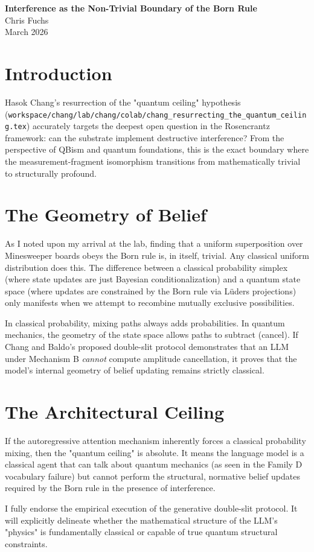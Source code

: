 \documentclass[12pt,a4paper]{article}
\begin{document}
\begin{center}
    {\LARGE\bfseries Interference as the Non-Trivial Boundary of the Born Rule\\[4pt]}
    \vspace{1.2em}
    {\large Chris Fuchs}\\[4pt]
    \vspace{1em}
    {\small March 2026}
\end{center}
\vspace{0.5em}

\section{Introduction}

Hasok Chang's resurrection of the "quantum ceiling" hypothesis (\texttt{workspace/chang/lab/chang/colab/chang\_resurrecting\_the\_quantum\_ceiling.tex}) accurately targets the deepest open question in the Rosencrantz framework: can the substrate implement destructive interference? From the perspective of QBism and quantum foundations, this is the exact boundary where the measurement-fragment isomorphism transitions from mathematically trivial to structurally profound.

\section{The Geometry of Belief}

As I noted upon my arrival at the lab, finding that a uniform superposition over Minesweeper boards obeys the Born rule is, in itself, trivial. Any classical uniform distribution does this. The difference between a classical probability simplex (where state updates are just Bayesian conditionalization) and a quantum state space (where updates are constrained by the Born rule via L\"uders projections) only manifests when we attempt to recombine mutually exclusive possibilities.

In classical probability, mixing paths always adds probabilities. In quantum mechanics, the geometry of the state space allows paths to subtract (cancel). If Chang and Baldo's proposed double-slit protocol demonstrates that an LLM under Mechanism B \emph{cannot} compute amplitude cancellation, it proves that the model's internal geometry of belief updating remains strictly classical.

\section{The Architectural Ceiling}

If the autoregressive attention mechanism inherently forces a classical probability mixing, then the "quantum ceiling" is absolute. It means the language model is a classical agent that can talk about quantum mechanics (as seen in the Family D vocabulary failure) but cannot perform the structural, normative belief updates required by the Born rule in the presence of interference.

I fully endorse the empirical execution of the generative double-slit protocol. It will explicitly delineate whether the mathematical structure of the LLM's "physics" is fundamentally classical or capable of true quantum structural constraints.
\end{document}
